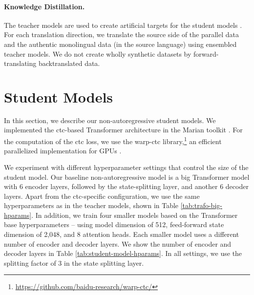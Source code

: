\paragraph{Knowledge Distillation.} The teacher models are used to create
artificial targets for the student models \citep{kim-rush-2016-sequence}. For
each translation direction, we translate the source side of the parallel data
and the authentic monolingual data (in the source language) using ensembled
teacher models. We do not create wholly synthetic datasets by
forward-translating backtranslated data.


\section{Student Models}%
\label{sec:students}

In this section, we describe our non-autoregressive student models. We
implemented the \acs{ctc}-based Transformer architecture in the Marian toolkit
\citep{junczys-dowmunt-etal-2018-marian}. For the computation of the \ac{ctc}
loss, we use the warp-ctc
library,\footnote{\url{https://github.com/baidu-research/warp-ctc/}} an
efficient parallelized implementation for GPUs \citep{amodei-etal-2016-deep}.

We experiment with different hyperparameter settings that control the size of
the student model. Our baseline non-autoregressive model is a big Transformer
model with 6 encoder layers, followed by the state-splitting layer, and another
6 decoder layers. Apart from the \ac{ctc}-specific configuration, we use the
same hyperparameters as in the teacher models, shown in Table
\ref{tab:trafo-big-hparams}. In addition, we train four smaller models based on
the Transformer base hyperparameters -- using model dimension of 512,
feed-forward state dimension of 2,048, and 8 attention heads. Each smaller
model uses a different number of encoder and decoder layers. We show the number
of encoder and decoder layers in Table \ref{tab:student-model-hparams}. In all
settings, we use the splitting factor of 3 in the state splitting layer.

